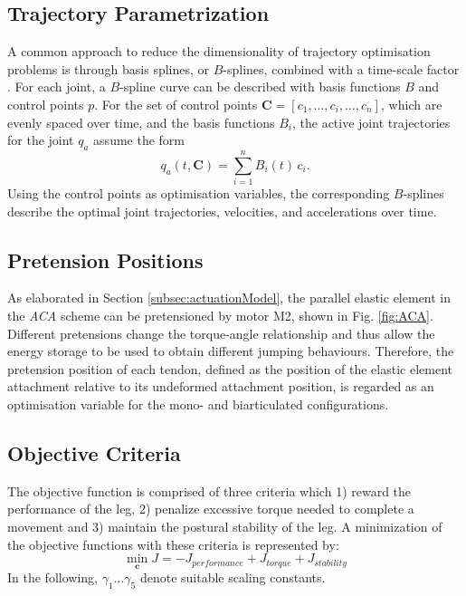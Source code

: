 \documentclass[letterpaper, 10 pt, conference]{ieeeconf}  %
\begin{document}
	\subsection{Trajectory Parametrization} 
	\label{subsec:trajectoryParametrization}
	A common approach to reduce the dimensionality of trajectory optimisation problems is through basis splines, or $B$-splines, combined with a time-scale factor \cite{ude2000planning,babivc2009biarticulated,wang1999weight,albro2001optimal}. For each joint, a $B$-spline curve can be described with basis functions $B$ and control points $p$. For the set of control points $\mathbf{C}=\left[c_1,\dots,c_i,\dots,c_n\right]$, which are evenly spaced over time, and the basis functions $B_i$, the active joint trajectories for the joint $q_a$ assume the form
	\begin{equation}
	q_a(t,\mathbf{C}) = \sum_{i=1}^{n} B_i (t) \, c_i.
	\end{equation}
	Using the control points as optimisation variables, the corresponding $B$-splines describe the optimal joint trajectories, velocities, and accelerations over time. 
	
	\subsection{Pretension Positions} 
	\label{subsec:pretensionPositions}
	As elaborated in Section \ref{subsec:actuationModel}, the parallel elastic element in the \textit{ACA} scheme can be pretensioned by motor M2, shown in Fig. \ref{fig:ACA}. Different pretensions change the torque-angle relationship and thus allow the energy storage to be used to obtain different jumping behaviours. Therefore, the pretension position of each tendon, defined as the position of the elastic element attachment relative to its undeformed attachment position, is regarded as an optimisation variable for the mono- and biarticulated configurations.
	
	\subsection{Objective Criteria} 
	\label{subsec:objectiveCriteria}
	The objective function is comprised of three criteria which 1) reward the performance of the leg, 2) penalize excessive torque needed to complete a movement and 3) maintain the postural stability of the leg. A minimization of the objective functions with these criteria is represented by:
	\begin{equation}
	\min_{\mathbf{c}} J = -J_{performance} + J_{torque} + J_{stability}
	\end{equation}
	In the following, $\gamma_1 \dots \gamma_5$ denote suitable scaling constants.
	
\end{document}
